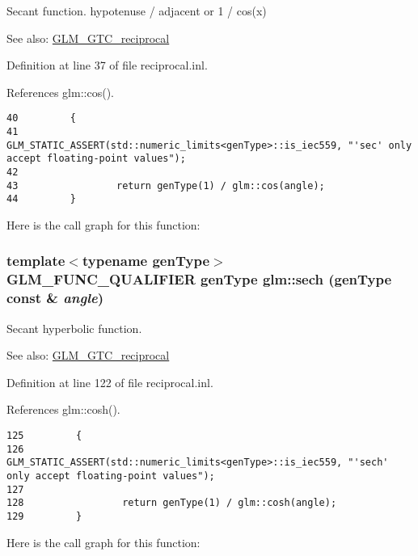 Secant function. hypotenuse / adjacent or 1 / cos(x)

\begin{Desc}
\item[See also:]\hyperlink{group__gtc__reciprocal}{GLM\_\-GTC\_\-reciprocal} \end{Desc}


Definition at line 37 of file reciprocal.inl.

References glm::cos().

\begin{Code}\begin{verbatim}40         {
41                 GLM_STATIC_ASSERT(std::numeric_limits<genType>::is_iec559, "'sec' only accept floating-point values");
42 
43                 return genType(1) / glm::cos(angle);
44         }
\end{verbatim}
\end{Code}




Here is the call graph for this function:\hypertarget{group__gtc__reciprocal_g6193b8e823dea616d6badca8076da066}{
\subsubsection[sech]{\setlength{\rightskip}{0pt plus 5cm}template$<$typename genType$>$ GLM\_\-FUNC\_\-QUALIFIER genType glm::sech (genType const \& {\em angle})}}
\label{group__gtc__reciprocal_g6193b8e823dea616d6badca8076da066}


Secant hyperbolic function.

\begin{Desc}
\item[See also:]\hyperlink{group__gtc__reciprocal}{GLM\_\-GTC\_\-reciprocal} \end{Desc}


Definition at line 122 of file reciprocal.inl.

References glm::cosh().

\begin{Code}\begin{verbatim}125         {
126                 GLM_STATIC_ASSERT(std::numeric_limits<genType>::is_iec559, "'sech' only accept floating-point values");
127 
128                 return genType(1) / glm::cosh(angle);
129         }
\end{verbatim}
\end{Code}




Here is the call graph for this function:
